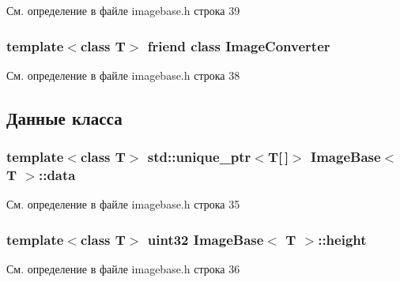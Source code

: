 См. определение в файле imagebase.\+h строка 39

\subsubsection[{\texorpdfstring{Image\+Converter}{ImageConverter}}]{\setlength{\rightskip}{0pt plus 5cm}template$<$class T$>$ friend class {\bf Image\+Converter}\hspace{0.3cm}{\ttfamily [friend]}}\hypertarget{class_image_base_a683b929065aaead03ccce450a7b4ab30}{}\label{class_image_base_a683b929065aaead03ccce450a7b4ab30}


См. определение в файле imagebase.\+h строка 38



\subsection{Данные класса}
\subsubsection[{\texorpdfstring{data}{data}}]{\setlength{\rightskip}{0pt plus 5cm}template$<$class T$>$ std\+::unique\+\_\+ptr$<$T\mbox{[}$\,$\mbox{]}$>$ {\bf Image\+Base}$<$ T $>$\+::data\hspace{0.3cm}{\ttfamily [private]}}\hypertarget{class_image_base_aa619aa7a0b2cf0b5e45b0fbc102329c1}{}\label{class_image_base_aa619aa7a0b2cf0b5e45b0fbc102329c1}


См. определение в файле imagebase.\+h строка 35

\subsubsection[{\texorpdfstring{height}{height}}]{\setlength{\rightskip}{0pt plus 5cm}template$<$class T$>$ {\bf uint32} {\bf Image\+Base}$<$ T $>$\+::height\hspace{0.3cm}{\ttfamily [private]}}\hypertarget{class_image_base_a2f5f532885f040113c198c424cc0ec7f}{}\label{class_image_base_a2f5f532885f040113c198c424cc0ec7f}


См. определение в файле imagebase.\+h строка 36


